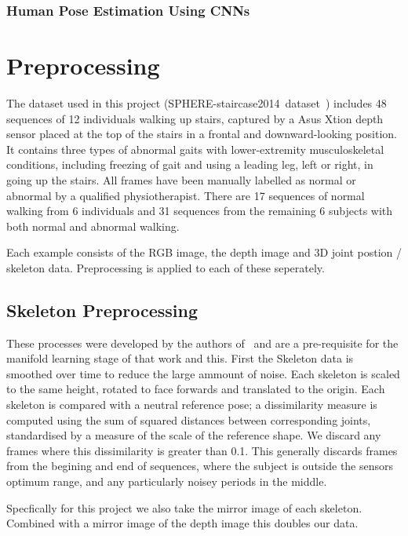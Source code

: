 \documentclass[11pt]{article} %
\begin{document}
\subsubsection{Human Pose Estimation Using CNNs}



\section{Preprocessing}
\label{sec:preprocessing}

The dataset used in this project (SPHERE-staircase2014~dataset~\cite{Paiement}) includes 48 sequences of 12 individuals walking up stairs, captured by a Asus Xtion depth sensor placed at the top of the stairs in a frontal and downward-looking position. It contains three types of abnormal gaits with lower-extremity musculoskeletal conditions, including freezing of gait and using a leading leg, left or right, in going up the stairs. All frames have been manually labelled as normal or abnormal by a qualified physiotherapist. There are 17 sequences of normal walking from 6 individuals and 31 sequences from the remaining 6 subjects with both normal and abnormal walking.

Each example consists of the RGB image, the depth image and 3D joint postion / skeleton data. Preprocessing is applied to each of these seperately.

\subsection{Skeleton Preprocessing}

These processes were developed by the authors of~\cite{Paiement} and are a pre-requisite for the manifold learning stage of that work and this. First the Skeleton data is smoothed over time to reduce the large ammount of noise. Each skeleton is scaled to the same height, rotated to face forwards and translated to the origin. Each skeleton is compared with a neutral reference pose;  a dissimilarity measure is computed  using the sum of squared distances between corresponding joints, standardised by a measure of the scale of the reference shape. We discard any frames where this dissimilarity is greater than 0.1. This generally discards frames from the begining and end of sequences, where the subject is outside the sensors optimum range, and any particularly noisey periods in the middle. 

Specfically for this project we also take the mirror image of each skeleton. Combined with a mirror image of the depth image this doubles our data. 
\end{document}
